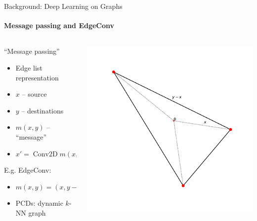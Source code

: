 \documentclass{beamer}
\begin{document}
\begin{frame}{Background: Deep Learning on Graphs}
    \framesubtitle{Message passing and EdgeConv}

    \begin{columns}
        \begin{column}{.45\linewidth}
            ``Message passing''
            \begin{itemize}
                    \item Edge list representation
                    \item \( x \) -- source
                    \item \( y \) -- destinations
                    \item \( m(x, y) \) -- ``message''
                    \item \( x' = \operatorname{Conv2D} m(x, y) \)
            \end{itemize}
            E.g. EdgeConv:
            \begin{itemize}
                \item \( m(x, y) = (x, y-x) \)
                \item PCDs: dynamic \( k \)-NN graph
            \end{itemize}
        \end{column}
        \begin{column}{.5\linewidth}
            \includegraphics[width=\linewidth]{art/edgeconv-features.pdf}
        \end{column}
    \end{columns}
\end{frame}
\end{document}
